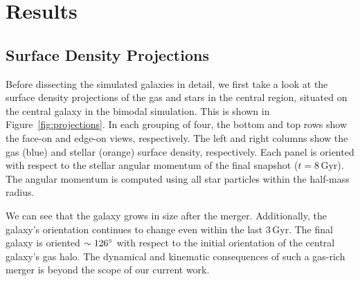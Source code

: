 \documentclass[linenumbers, twocolumn]{aastex631}
\newcommand{\Msun}{\ensuremath{M_{\odot}}}
\newcommand{\Gyr}{\ensuremath{\textrm{Gyr}}}
\newcommand{\kpc}{\ensuremath{\textrm{kpc}}}
\newcommand{\pc}{\ensuremath{\textrm{pc}}}
\begin{document}
\section{Results}\label{sec:results}
\subsection{Surface Density Projections}\label{ssec:projections}
Before dissecting the simulated galaxies in detail, we first take a look at the surface density projections of the gas and stars in the central region, situated on the central galaxy in the bimodal simulation. This is shown in Figure~\ref{fig:projections}. In each grouping of four, the bottom and top rows show the face-on and edge-on views, respectively. The left and right columns show the gas (blue) and stellar (orange) surface density, respectively. Each panel is oriented with respect to the stellar angular momentum of the final snapshot ($t=8\,\Gyr$). The angular momentum is computed using all star particles within the half-mass radius.

We can see that the galaxy grows in size after the merger. Additionally, the galaxy's orientation continues to change even within the last $3\,\Gyr$. The final galaxy is oriented $\sim126\degree$ with respect to the initial orientation of the central galaxy's gas halo. The dynamical and kinematic consequences of such a gas-rich merger is beyond the scope of our current work.

\begin{figure*}
  \centering

  \caption{Frames from a movie showing a surface density projection of the bimodal simulation over time. In each frame, the left/right (blue/orange) column shows the gas/star surface density. The upper/lower panels show the edge-on and face-on view. Every panel is oriented with respect to the final ($t=8\,\Gyr$) snapshot. The side-length of each panel is $30\,\kpc$, and the image is a projection through a box with the same side-length. The colormap for the gas ranges from $1$ to $10^2\,\Msun/\pc^2$, while for the stars ranges from $1$ to $10^4\,\Msun/\pc^2$. (A full movie is \href{https://drive.google.com/file/d/1RKpFpnFIpl7XYAX5lvF7CyaPVO5dS3EO/view?usp=drive_link}{here}.)}
  \label{fig:projections}
\end{figure*}
\end{document}
